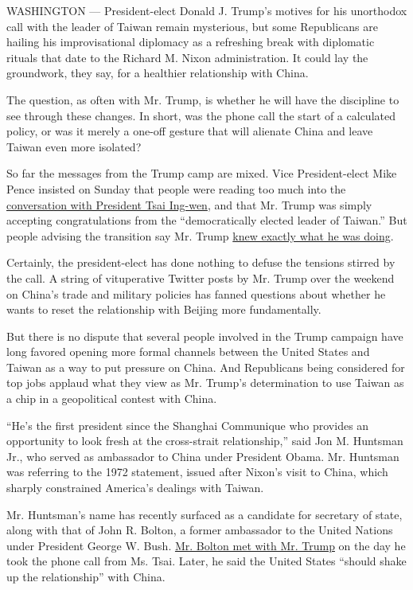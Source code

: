 WASHINGTON --- President-elect Donald J. Trump's motives for his
unorthodox call with the leader of Taiwan remain mysterious, but some
Republicans are hailing his improvisational diplomacy as a refreshing
break with diplomatic rituals that date to the Richard M. Nixon
administration. It could lay the groundwork, they say, for a healthier
relationship with China.

The question, as often with Mr. Trump, is whether he will have the
discipline to see through these changes. In short, was the phone call
the start of a calculated policy, or was it merely a one-off gesture
that will alienate China and leave Taiwan even more isolated?

So far the messages from the Trump camp are mixed. Vice President-elect
Mike Pence insisted on Sunday that people were reading too much into the
\href{https://www.nytimes.com/2016/12/02/us/politics/trump-speaks-with-taiwans-leader-a-possible-affront-to-china.html?_r=0}{conversation
with President Tsai Ing-wen}, and that Mr. Trump was simply accepting
congratulations from the ``democratically elected leader of Taiwan.''
But people advising the transition say Mr. Trump
\href{https://www.washingtonpost.com/politics/trumps-taiwan-phone-call-was-weeks-in-the-planning-say-people-who-were-involved/2016/12/04/f8be4b0c-ba4e-11e6-94ac-3d324840106c_story.html}{knew
exactly what he was doing}.

Certainly, the president-elect has done nothing to defuse the tensions
stirred by the call. A string of vituperative Twitter posts by Mr. Trump
over the weekend on China's trade and military policies has fanned
questions about whether he wants to reset the relationship with Beijing
more fundamentally.

But there is no dispute that several people involved in the Trump
campaign have long favored opening more formal channels between the
United States and Taiwan as a way to put pressure on China. And
Republicans being considered for top jobs applaud what they view as Mr.
Trump's determination to use Taiwan as a chip in a geopolitical contest
with China.

``He's the first president since the Shanghai Communique who provides an
opportunity to look fresh at the cross-strait relationship,'' said Jon
M. Huntsman Jr., who served as ambassador to China under President
Obama. Mr. Huntsman was referring to the 1972 statement, issued after
Nixon's visit to China, which sharply constrained America's dealings
with Taiwan.

Mr. Huntsman's name has recently surfaced as a candidate for secretary
of state, along with that of John R. Bolton, a former ambassador to the
United Nations under President George W. Bush.
\href{https://www.nytimes.com/2016/12/04/us/politics/trump-expands-search-for-secretary-of-state.html}{Mr.
Bolton met with Mr. Trump} on the day he took the phone call from Ms.
Tsai. Later, he said the United States ``should shake up the
relationship'' with China.

